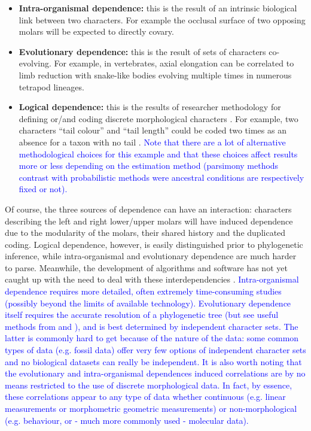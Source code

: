 \documentclass[12pt,letterpaper]{article}
\begin{document}
\begin{itemize}
    \item \textbf{Intra-organismal dependence:} this is the result of an intrinsic biological link between two characters.
    For example the occlusal surface of two opposing molars will be expected to directly covary.
 
    \item \textbf{Evolutionary dependence:} this is the result of sets of characters co-evolving. 
    For example, in vertebrates, axial elongation can be correlated to limb reduction with snake-like bodies evolving multiple times in numerous tetrapod lineages.

    \item \textbf{Logical dependence:} this is the results of researcher methodology for defining or/and coding discrete morphological characters \citep{Brazeau2011,simoes2017giant}.
    For example, two characters ``tail colour'' and ``tail length'' could be coded two times as an absence for a taxon with no tail \citep{wilkinson1995coping,BrazeauNA}.
    \textcolor{blue}{Note that there are a lot of alternative methodological choices for this example \citep[e.g. using inapplicable tokens; ][]{Brazeau2011} and that these choices affect results more or less depending on the estimation method (parsimony methods contrast with probabilistic methods were ancestral conditions are respectively fixed or not).}
\end{itemize}

\noindent Of course, the three sources of dependence can have an interaction: characters describing the left and right lower/upper molars will have induced dependence due to the modularity of the molars, their shared history and the duplicated coding.
Logical dependence, however, is easily distinguished prior to phylogenetic inference, while intra-organismal and evolutionary dependence are much harder to parse.
Meanwhile, the development of algorithms and software has not yet caught up with the need to deal with these interdependencies \citep{de2015parsimony,BrazeauNA}.
\textcolor{blue}{Intra-organismal dependence requires more detailed, often extremely time-consuming studies (possibly beyond the limits of available technology).
Evolutionary dependence itself requires the accurate resolution of a phylogenetic tree (but see useful methods from \citealt{Pagel1994} and \citealt{billet2019serial}), and is best determined by independent character sets.}
\textcolor{blue}{The latter is commonly hard to get because of the nature of the data: some common types of data (e.g. fossil data) offer very few options of independent character sets and no biological datasets can really be independent.
It is also worth noting that the evolutionary and intra-organismal dependences induced correlations are by no means restricted to the use of discrete morphological data. In fact, by essence, these correlations appear to any type of data whether continuous (e.g. linear measurements or morphometric geometric measurements) or non-morphological (e.g. behaviour, or - much more commonly used - molecular data).}
\end{document}
